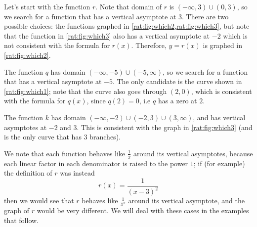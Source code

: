 \begin{pccexample}
		 \begin{pccsolution}
			 Let's start with the function $r$. Note that domain of $r$ is $(-\infty,3)\cup(0,3)$, so
			 we search for a function that has a vertical asymptote at $3$. There
			 are two possible choices: the functions graphed in \cref{rat:fig:which2,rat:fig:which3},
			 but note that the function in \cref{rat:fig:which3} also has a vertical asymptote at $-2$
			 which is not consistent with the formula for $r(x)$. Therefore, $y=r(x)$
			 is graphed in \cref{rat:fig:which2}.

			 The function $q$ has domain $(-\infty,-5)\cup(-5,\infty)$, so we search
			 for a function that has a vertical asymptote at $-5$. The only candidate
			 is the curve shown in \cref{rat:fig:which1}; note that the curve also goes through $(2,0)$,
			 which is consistent with the formula for $q(x)$, since $q(2)=0$, i.e $q$
			 has a zero at $2$.

			 The function $k$ has domain $(-\infty,-2)\cup(-2,3)\cup(3,\infty)$, and
			 has vertical asymptotes at $-2$ and $3$. This is consistent with
			 the graph in \cref{rat:fig:which3} (and is the only curve that
			 has $3$ branches).

			 We note that each function behaves like $\frac{1}{x}$ around its vertical asymptotes,
			 because each linear factor in each denominator is raised to the power $1$; if (for example)
			 the definition of $r$ was instead
			 \[
				 r(x)=\frac{1}{(x-3)^2}
			 \]
			 then we would see that $r$ behaves like $\frac{1}{x^2}$ around its vertical asymptote, and
			 the graph of $r$ would be very different. We will deal with these cases in the examples that follow.
		 \end{pccsolution}
	 \end{pccexample}

